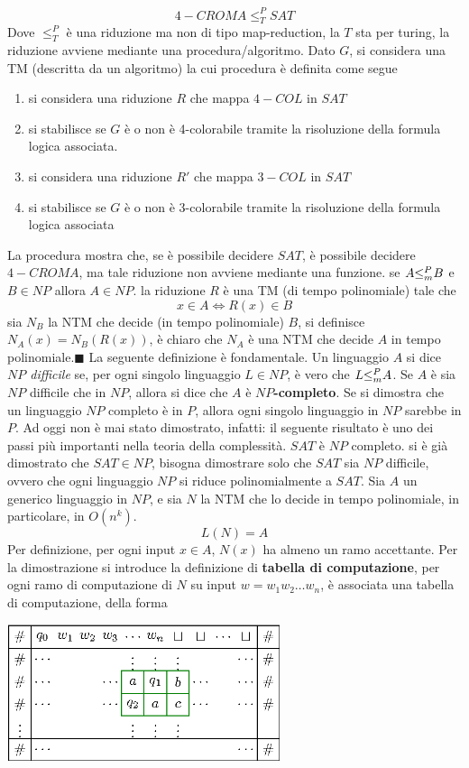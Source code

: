 \documentclass[10pt, letterpaper]{report}
\begin{document}
$$ 4-CROMA \le_T^P SAT$$ 
Dove $\le_T^P$ è una riduzione ma non di tipo map-reduction, la $T$ sta per turing, la riduzione avviene mediante una procedura/algoritmo.\acc 
Dato $G$, si considera una TM (descritta da un algoritmo) la cui procedura è definita come segue\begin{enumerate}
    \item si considera una riduzione $R$ che mappa $4-COL$ in $SAT$ 
    \item si stabilisce se $G$ è o non è 4-colorabile tramite la risoluzione della formula logica associata. 
    \item si considera una riduzione $R'$ che mappa $3-COL$ in $SAT$ 
    \item  si stabilisce se $G$ è o non è 3-colorabile tramite la risoluzione della formula logica associata  
\end{enumerate}
La procedura mostra che, se è possibile decidere $SAT$, è possibile decidere $4-CROMA$, ma tale riduzione non avviene mediante una funzione.\acc 
\teo{} se $A{\le_m^P} B$ e $B\in NP$ allora $A\in NP$. \acc 
\dimo{} la riduzione $R$ è una TM (di tempo polinomiale) tale che $$ x\in A\iff R(x)\in B$$
sia $N_B$ la NTM che decide (in tempo polinomiale) $B$, si definisce $N_A(x)=N_B(R(x))$, è chiaro che $N_A$ è una NTM che decide $A$ in tempo polinomiale.\hfill$\blacksquare$\acc 
La seguente definizione è fondamentale. \acc 
{} Un linguaggio $A$ si dice \textit{$NP$ difficile} se, per ogni singolo linguaggio $L\in NP$, è vero che $L{\le_m^P} A$. Se $A$ è sia $NP$ difficile che in $NP$, allora si dice che $A$ è \textbf{$NP$-completo}. \acc 
Se si dimostra che un linguaggio $NP$ completo è in $P$, allora ogni singolo linguaggio in $NP$ sarebbe in $P$. Ad oggi non è mai stato dimostrato, infatti: 
il seguente risultato è uno dei passi più importanti nella teoria della complessità.\acc
{} $SAT$ è $NP$ completo.\acc 
\dimo{} si è già dimostrato che $SAT\in NP$, bisogna dimostrare solo che $SAT$ sia $NP$ difficile, ovvero che ogni linguaggio $NP$ si riduce polinomialmente a $SAT$.\acc 
Sia $A$ un generico linguaggio in $NP$, e sia $N$ la NTM che lo decide in tempo polinomiale, in particolare, in $O(n^k)$. $$ L(N)=A$$
Per definizione, per ogni input $x\in A$, $N(x)$ ha almeno un ramo accettante.\acc 
Per la dimostrazione si introduce la definizione di \textbf{tabella di computazione}, per ogni ramo di computazione di $N$ su input $w=w_1w_2\dots w_n$, è associata una tabella di computazione, della forma \begin{center}
    \includegraphics[width=0.6\textwidth ]{images/tabellaComputazione.eps}
\end{center}
\end{document}
